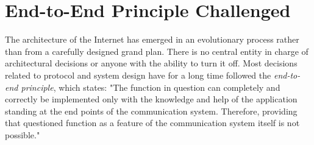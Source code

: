 




%



\section{End-to-End Principle Challenged}

The architecture of the Internet has emerged in an evolutionary process rather than from a carefully designed grand plan. There is no central entity in charge of architectural decisions or anyone with the ability to turn it off. Most decisions related to protocol and system design have for a long time followed the \textit{end-to-end principle}, which states: "The function in question can completely and correctly be implemented only with the knowledge and help of the application standing at the end points of the communication system. Therefore, providing that questioned function as a feature of the communication system itself is not possible." \cite{endtoend}

